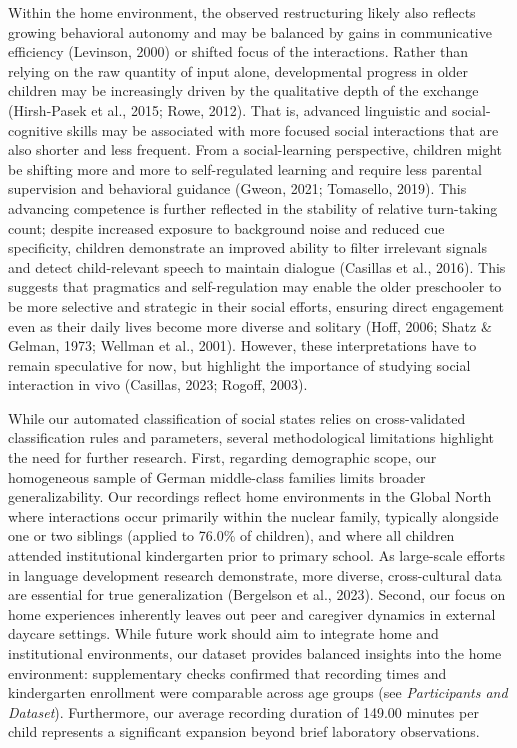 \documentclass[
  english,
  12pt,
  man,floatsintext]{apa6}
\begin{document}
Within the home environment, the observed restructuring likely also reflects growing behavioral autonomy and may be balanced by gains in communicative efficiency (Levinson, 2000) or shifted focus of the interactions. Rather than relying on the raw quantity of input alone, developmental progress in older children may be increasingly driven by the qualitative depth of the exchange (Hirsh-Pasek et al., 2015; Rowe, 2012). That is, advanced linguistic and social-cognitive skills may be associated with more focused social interactions that are also shorter and less frequent. From a social-learning perspective, children might be shifting more and more to self-regulated learning and require less parental supervision and behavioral guidance (Gweon, 2021; Tomasello, 2019). This advancing competence is further reflected in the stability of relative turn-taking count; despite increased exposure to background noise and reduced cue specificity, children demonstrate an improved ability to filter irrelevant signals and detect child-relevant speech to maintain dialogue (Casillas et al., 2016). This suggests that pragmatics and self-regulation may enable the older preschooler to be more selective and strategic in their social efforts, ensuring direct engagement even as their daily lives become more diverse and solitary (Hoff, 2006; Shatz \& Gelman, 1973; Wellman et al., 2001). However, these interpretations have to remain speculative for now, but highlight the importance of studying social interaction in vivo (Casillas, 2023; Rogoff, 2003).

While our automated classification of social states relies on cross-validated classification rules and parameters, several methodological limitations highlight the need for further research. First, regarding demographic scope, our homogeneous sample of German middle-class families limits broader generalizability. Our recordings reflect home environments in the Global North where interactions occur primarily within the nuclear family, typically alongside one or two siblings (applied to 76.0\% of children), and where all children attended institutional kindergarten prior to primary school. As large-scale efforts in language development research demonstrate, more diverse, cross-cultural data are essential for true generalization (Bergelson et al., 2023). Second, our focus on home experiences inherently leaves out peer and caregiver dynamics in external daycare settings. While future work should aim to integrate home and institutional environments, our dataset provides balanced insights into the home environment: supplementary checks confirmed that recording times and kindergarten enrollment were comparable across age groups (see \emph{Participants and Dataset}). Furthermore, our average recording duration of 149.00 minutes per child represents a significant expansion beyond brief laboratory observations.
\end{document}
